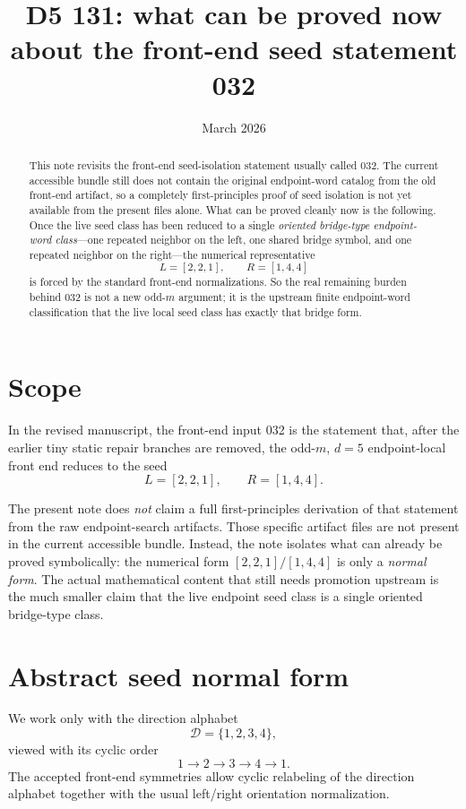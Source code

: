 \documentclass[11pt]{article}
\title{D5 131: what can be proved now about the front-end seed statement \textup{032}}
\author{}
\date{March 2026}
\begin{document}
\maketitle

\begin{abstract}
This note revisits the front-end seed-isolation statement usually called
\textup{032}.
The current accessible bundle still does not contain the original endpoint-word
catalog from the old front-end artifact, so a completely first-principles proof
of seed isolation is not yet available from the present files alone.
What can be proved cleanly now is the following.
Once the live seed class has been reduced to a single \emph{oriented
bridge-type endpoint-word class}---one repeated neighbor on the left, one
shared bridge symbol, and one repeated neighbor on the right---the numerical
representative
\[
L=[2,2,1],\qquad R=[1,4,4]
\]
is forced by the standard front-end normalizations.
So the real remaining burden behind \textup{032} is not a new odd-$m$ argument;
it is the upstream finite endpoint-word classification that the live local seed
class has exactly that bridge form.
\end{abstract}

\section{Scope}

In the revised manuscript, the front-end input \textup{032} is the statement
that, after the earlier tiny static repair branches are removed, the odd-$m$,
$d=5$ endpoint-local front end reduces to the seed
\[
L=[2,2,1],\qquad R=[1,4,4].
\]

The present note does \emph{not} claim a full first-principles derivation of
that statement from the raw endpoint-search artifacts.
Those specific artifact files are not present in the current accessible bundle.
Instead, the note isolates what can already be proved symbolically: the
numerical form $[2,2,1]/[1,4,4]$ is only a \emph{normal form}.
The actual mathematical content that still needs promotion upstream is the much
smaller claim that the live endpoint seed class is a single oriented
bridge-type class.

\section{Abstract seed normal form}

We work only with the direction alphabet
\[
\mathcal D=\{1,2,3,4\},
\]
viewed with its cyclic order
\[
1\to 2\to 3\to 4\to 1.
\]
The accepted front-end symmetries allow cyclic relabeling of the direction
alphabet together with the usual left/right orientation normalization.
\end{document}
